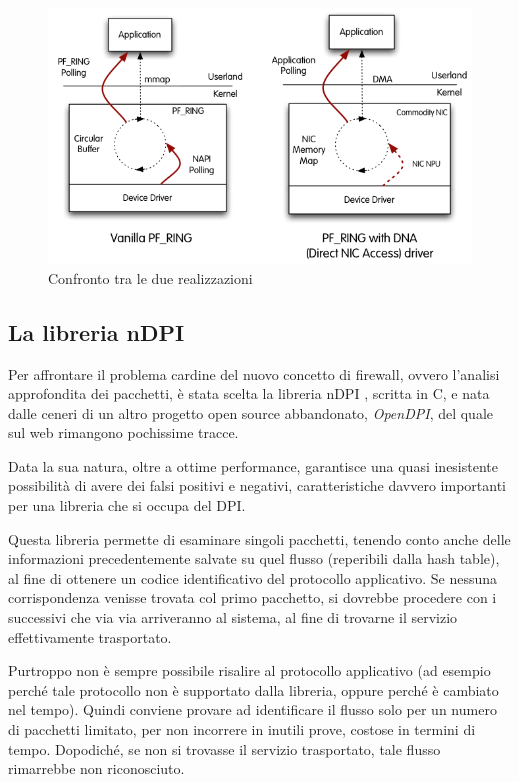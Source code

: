 \begin{figure}[htbp]
\begin{center}
\includegraphics[scale=0.5]{img/PF_Ring_DNA.png}
\caption{Confronto tra le due realizzazioni}\label{PFRingDNA}
\end{center}
\end{figure}

\subsection{La libreria nDPI}

Per affrontare il problema cardine del nuovo concetto di firewall, ovvero l'analisi approfondita dei pacchetti, è stata scelta la libreria nDPI \cite{ndpi}, scritta in C, e nata dalle ceneri di un altro progetto open source abbandonato, \emph{OpenDPI}, del quale sul web rimangono pochissime tracce.

Data la sua natura, oltre a ottime performance, garantisce una quasi inesistente possibilità di avere dei falsi positivi e negativi, caratteristiche davvero importanti per una libreria che si occupa del DPI.

Questa libreria permette di esaminare singoli pacchetti, tenendo conto anche delle informazioni precedentemente salvate su quel flusso (reperibili dalla hash table), al fine di ottenere un codice identificativo del protocollo applicativo. Se nessuna corrispondenza venisse trovata col primo pacchetto, si dovrebbe procedere con i successivi che via via arriveranno al sistema, al fine di trovarne il servizio effettivamente trasportato.

Purtroppo non è sempre possibile risalire al protocollo applicativo (ad esempio perché tale protocollo non è supportato dalla libreria, oppure perché è cambiato nel tempo). Quindi conviene provare ad identificare il flusso solo per un numero di pacchetti limitato, per non incorrere in inutili prove, costose in termini di tempo. Dopodiché, se non si trovasse il servizio trasportato, tale flusso rimarrebbe non riconosciuto.

